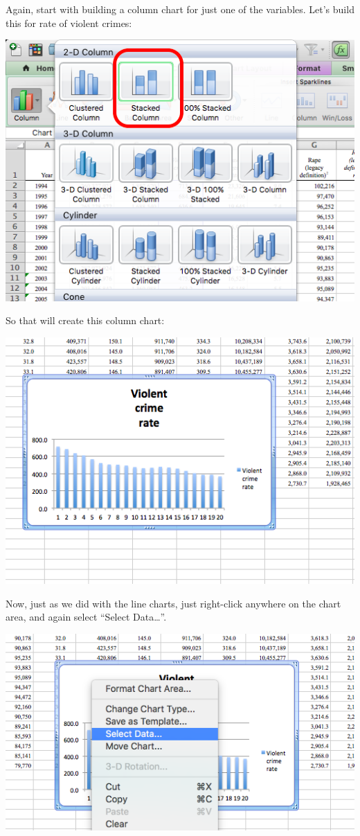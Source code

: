 \documentclass[]{book}
\theoremstyle{definition}
\theoremstyle{definition}
\theoremstyle{definition}
\theoremstyle{remark}
\begin{document}
Again, start with building a column chart for just one of the variables.
Let's build this for rate of violent crimes:

\includegraphics{imgs/stackedbar_1.png}

So that will create this column chart:

\includegraphics{imgs/stackedbar_2.png}

Now, just as we did with the line charts, just right-click anywhere on
the chart area, and again select ``Select Data\ldots{}''.

\includegraphics{imgs/stackedbar_3.png}
\end{document}
